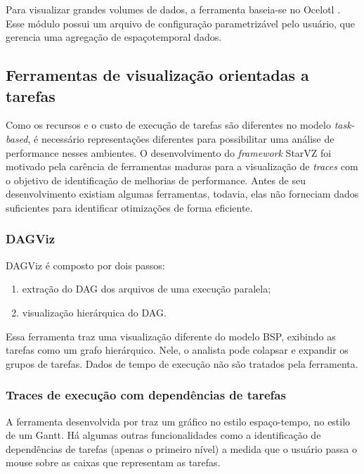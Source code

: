 \documentclass[prop-esp]{iiufrgs}
\begin{document}
Para visualizar grandes volumes de dados, a ferramenta baseia-se no Ocelotl \cite{ref:ocelotl}. Esse módulo possui um arquivo de configuração parametrizável pelo usuário, que gerencia uma agregação de espaçotemporal dados.

\subsection*{Ferramentas de visualização orientadas a tarefas}

Como os recursos e o custo de execução de tarefas são diferentes no modelo \emph{task-based}, é necessário representações diferentes para
possibilitar uma análise de performance nesses ambientes. O desenvolvimento do \emph{framework} StarVZ \cite{ref:starvz} foi motivado pela carência
de ferramentas maduras para a visualização de \emph{traces} com o objetivo de identificação de melhorias de performance. Antes de seu desenvolvimento existiam algumas ferramentas, todavia, elas não forneciam dados suficientes para identificar otimizações de forma eficiente.

\subsubsection*{DAGViz}

DAGViz \cite{ref:dagviz} é composto por dois passos: 

\begin{enumerate}
    \item extração do DAG dos arquivos de uma execução paralela;
    \item visualização hierárquica do DAG.
\end{enumerate}

Essa ferramenta traz uma visualização diferente do modelo BSP, exibindo as tarefas como um grafo hierárquico. Nele, o analista pode colapsar e expandir os grupos de tarefas. Dados de tempo de execução não são tratados pela ferramenta.

\subsubsection*{Traces de execução com dependências de tarefas}

A ferramenta desenvolvida por \citet{ref:visuexecdep} traz um gráfico no estilo espaço-tempo, no estilo de um Gantt. Há algumas outras funcionalidades como a identificação de dependências de tarefas (apenas o primeiro nível) a medida que o usuário passa o mouse sobre as caixas que representam as tarefas.
\end{document}
